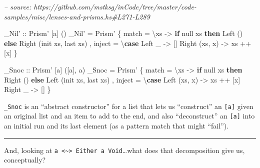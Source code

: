 \documentclass[]{article}
\newenvironment{Shaded}{}{}
\newcommand{\CommentTok}[1]{\textcolor[rgb]{0.38,0.63,0.69}{\textit{#1}}}
\newcommand{\DataTypeTok}[1]{\textcolor[rgb]{0.56,0.13,0.00}{#1}}
\newcommand{\FunctionTok}[1]{\textcolor[rgb]{0.02,0.16,0.49}{#1}}
\newcommand{\KeywordTok}[1]{\textcolor[rgb]{0.00,0.44,0.13}{\textbf{#1}}}
\newcommand{\NormalTok}[1]{#1}
\newcommand{\OtherTok}[1]{\textcolor[rgb]{0.00,0.44,0.13}{#1}}
\begin{document}
\begin{Shaded}
\begin{Highlighting}[]
\CommentTok{-- source: https://github.com/mstksg/inCode/tree/master/code-samples/misc/lenses-and-prisms.hs#L271-L289}

\OtherTok{_Nil' ::} \DataTypeTok{Prism'}\NormalTok{ [a] ()}
\NormalTok{_Nil' }\FunctionTok{=} \DataTypeTok{Prism'}
\NormalTok{    \{ match  }\FunctionTok{=}\NormalTok{ \textbackslash{}xs }\OtherTok{->} \KeywordTok{if} \FunctionTok{null}\NormalTok{ xs}
        \KeywordTok{then} \DataTypeTok{Left}\NormalTok{  ()}
        \KeywordTok{else} \DataTypeTok{Right}\NormalTok{ (}\FunctionTok{init}\NormalTok{ xs, }\FunctionTok{last}\NormalTok{ xs)}
\NormalTok{    , inject }\FunctionTok{=}\NormalTok{ \textbackslash{}}\KeywordTok{case}
        \DataTypeTok{Left}\NormalTok{ _        }\OtherTok{->}\NormalTok{ []}
        \DataTypeTok{Right}\NormalTok{ (xs, x) }\OtherTok{->}\NormalTok{ xs }\FunctionTok{++}\NormalTok{ [x]}
\NormalTok{    \}}

\OtherTok{_Snoc ::} \DataTypeTok{Prism'}\NormalTok{ [a] ([a], a)}
\NormalTok{_Snoc }\FunctionTok{=} \DataTypeTok{Prism'}
\NormalTok{    \{ match  }\FunctionTok{=}\NormalTok{ \textbackslash{}xs }\OtherTok{->} \KeywordTok{if} \FunctionTok{null}\NormalTok{ xs}
        \KeywordTok{then} \DataTypeTok{Right}\NormalTok{ ()}
        \KeywordTok{else} \DataTypeTok{Left}\NormalTok{  (}\FunctionTok{init}\NormalTok{ xs, }\FunctionTok{last}\NormalTok{ xs)}
\NormalTok{    , inject }\FunctionTok{=}\NormalTok{ \textbackslash{}}\KeywordTok{case}
        \DataTypeTok{Left}\NormalTok{  (xs, x) }\OtherTok{->}\NormalTok{ xs }\FunctionTok{++}\NormalTok{ [x]}
        \DataTypeTok{Right}\NormalTok{ _       }\OtherTok{->}\NormalTok{ []}
\NormalTok{    \}}
\end{Highlighting}
\end{Shaded}

\texttt{\_Snoc} is an ``abstract constructor'' for a list that lets us
``construct'' an \texttt{{[}a{]}} given an original list and an item to add to
the end, and also ``deconstruct'' an \texttt{{[}a{]}} into an initial run and
its last element (as a pattern match that might ``fail'').

\begin{center}\rule{0.5\linewidth}{\linethickness}\end{center}

And, looking at
\texttt{a\ \textless{}\textasciitilde{}\textgreater{}\ Either\ a\ Void}\ldots{}what
does that decomposition give us, conceptually?
\end{document}
